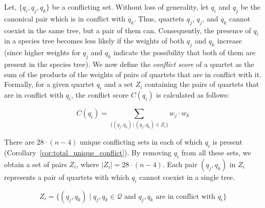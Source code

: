 \documentclass[10pt,a4paper]{article}
\newcommand{\addb}[1]{{\color{red} #1}}
\begin{document}

Let, $ \{q_i, q_j, q_k \} $ be a conflicting set. Without loss of generality, let $q_i$ and $q_j$ be the canonical pair which is in conflict with $q_k$. Thus, quartets $q_j$, $q_j$, and $q_k$ cannot coexist in the same tree, but a pair of them can. Consequently, the presence of $q_i$ in a species tree becomes less likely if the weights of both $q_j$ and $q_k$ increase (since higher weights for $q_j$ and $q_k$ indicate the possibility that both of them are present in the species tree). We now define the \textit{conflict score} of a quartet as the sum of the products of the weights of pairs of quartets that are in conflict with it. Formally, for a given quartet $q_i$ and a set $Z_i$ containing the pairs of quartets that are in conflict with $q_i$, the conflict score $C(q_i)$ is calculated as follows:

\begin{equation}
\label{eq:conflict_score}
C(q_i) = \sum_{\{(q_j, q_k) \,|\, (q_j, q_k) \in Z_i\}} w_j \cdot w_k
\end{equation}

There are $28 \cdot (n - 4)$ unique conflicting sets in each of which $q_i$ is present (Corollary~\ref{cor:total_unique_conflict}). By removing  $q_i$ from all these sets, we obtain a set of pairs $Z_i$, where $|Z_i| = 28 \cdot (n-4)$. Each pair $(q_j, q_k)$ in $Z_i$ represents a pair of quartets with which $q_i$ cannot coexist in a single tree. 


$$
Z_i = \{(q_j, q_k) \mid q_j, q_k \in \mathcal{Q} \text{ and } q_j, q_k \text{ are in conflict with } q_i\}
$$


\end{document}
